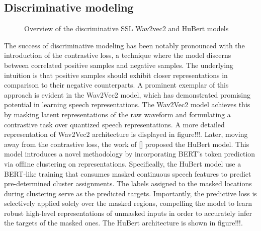 \subsection{Discriminative modeling}
\begin{figure}[ht]
    \centering
    \caption{Overview of the discriminative SSL Wav2vec2 and HuBert models}
\end{figure}
The success of discriminative modeling has been notably pronounced with the introduction of the contrastive loss, a technique where the model discerns between correlated positive samples and negative samples. The underlying intuition is that positive samples should exhibit closer representations in comparison to their negative counterparts. A prominent exemplar of this approach is evident in the Wav2Vec2 model, which has demonstrated promising potential in learning speech representations. The Wav2Vec2 model achieves this by masking latent representations of the raw waveform and formulating a contrastive task over quantized speech representations. A more detailed representation of Wav2Vec2 architecture is displayed in figure!!!. Later, moving away from the contrastive loss, the work of [] proposed the HuBert model. This model introduces a novel methodology by incorporating BERT's token prediction via offline clustering on representations. Specifically, the HuBert model use a BERT-like training that consumes masked continuous speech features to predict pre-determined cluster assignments. The labels assigned to the masked locations during clustering serve as the predicted targets. Importantly, the predictive loss is selectively applied solely over the masked regions, compelling the model to learn robust high-level representations of unmasked inputs in order to accurately infer the targets of the masked ones. The HuBert architecture is shown in figure!!!.
